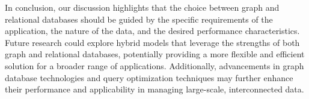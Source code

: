 In conclusion, our discussion highlights that the choice between graph and relational databases should be guided by the specific requirements of the application, the nature of the data, and the desired performance characteristics. Future research could explore hybrid models that leverage the strengths of both graph and relational databases, potentially providing a more flexible and efficient solution for a broader range of applications. Additionally, advancements in graph database technologies and query optimization techniques may further enhance their performance and applicability in managing large-scale, interconnected data.